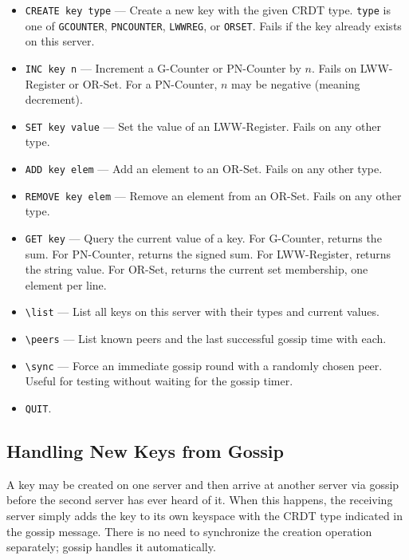 \documentclass[11pt,a4paper]{article}
\begin{document}
\begin{itemize}
\item \texttt{CREATE key type} --- Create a new key with the given CRDT type. \texttt{type} is one of \texttt{GCOUNTER}, \texttt{PNCOUNTER}, \texttt{LWWREG}, or \texttt{ORSET}. Fails if the key already exists on this server.

\item \texttt{INC key n} --- Increment a G-Counter or PN-Counter by $n$. Fails on LWW-Register or OR-Set. For a PN-Counter, $n$ may be negative (meaning decrement).

\item \texttt{SET key value} --- Set the value of an LWW-Register. Fails on any other type.

\item \texttt{ADD key elem} --- Add an element to an OR-Set. Fails on any other type.

\item \texttt{REMOVE key elem} --- Remove an element from an OR-Set. Fails on any other type.

\item \texttt{GET key} --- Query the current value of a key. For G-Counter, returns the sum. For PN-Counter, returns the signed sum. For LWW-Register, returns the string value. For OR-Set, returns the current set membership, one element per line.

\item \verb|\list| --- List all keys on this server with their types and current values.

\item \verb|\peers| --- List known peers and the last successful gossip time with each.

\item \verb|\sync| --- Force an immediate gossip round with a randomly chosen peer. Useful for testing without waiting for the gossip timer.

\item \texttt{QUIT}.
\end{itemize}

\subsection{Handling New Keys from Gossip}
A key may be created on one server and then arrive at another server via gossip before the second server has ever heard of it. When this happens, the receiving server simply adds the key to its own keyspace with the CRDT type indicated in the gossip message. There is no need to synchronize the creation operation separately; gossip handles it automatically.
\end{document}
